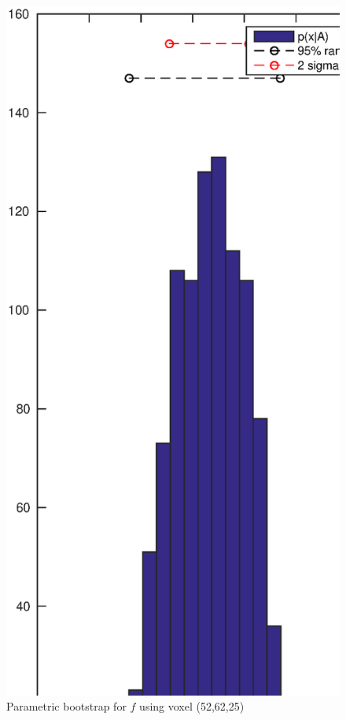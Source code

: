 \documentclass[11pt,a4paper,oneside]{report}
\begin{document}
\begin{figure}[H]
      \centering
    \includegraphics[scale=1]{figures/q2/q121-p3.eps}
    \caption{Parametric bootstrap for $f$ using voxel (52,62,25)}
    \label{q121-p3}
\end{figure}
\end{document}
